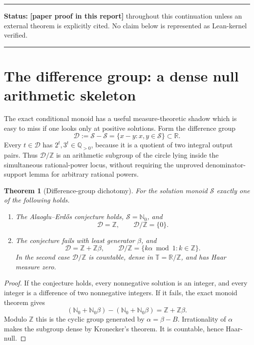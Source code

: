 \documentclass[11pt,oneside]{article}
\newtheorem{theorem}{Theorem}[section]
\theoremstyle{definition}
\theoremstyle{remark}
\newcommand{\Nzero}{\mathbb N_0}
\newcommand{\Z}{\mathbb Z}
\newcommand{\Q}{\mathbb Q}
\newcommand{\R}{\mathbb R}
\newcommand{\Torus}{\mathbb T}
\newcommand{\Sol}{\mathcal S}
\newcommand{\statusnew}{\textcolor{newgreen}{\textbf{[paper proof in this report]}}}
\newenvironment{statusbox}[1]
{\begin{center}\begin{minipage}{0.94\textwidth}\raggedright\hbadness=10000\hrule
\vspace{0.45em}\textbf{Status:} #1\par\vspace{0.35em}}
{\vspace{0.35em}\hrule\end{minipage}\end{center}}
\begin{document}
\begin{statusbox}{\statusnew{} throughout this continuation unless an external theorem is
explicitly cited.  No claim below is represented as Lean-kernel verified.}
\end{statusbox}

\section{The difference group: a dense null arithmetic skeleton}
\label{mt:sec-difference-group}

The exact conditional monoid has a useful measure-theoretic shadow which is easy to miss if one
looks only at positive solutions.  Form the difference group
\begin{equation}
  \mathcal D:=\Sol-\Sol
  =\{x-y:x,y\in\Sol\}\subset\R.
  \label{mt:eq-difference-group}
\end{equation}
Every $t\in\mathcal D$ has $2^t,3^t\in\Q_{>0}$, because it is a quotient of two integral
output pairs.  Thus $\mathcal D/\Z$ is an arithmetic subgroup of the circle lying inside the
simultaneous rational-power locus, without requiring the unproved denominator-support lemma
for arbitrary rational powers.

\begin{theorem}[Difference-group dichotomy]
\label{mt:thm-difference-group}
For the solution monoid $\Sol$ exactly one of the following holds.
\begin{enumerate}[label=\textup{(\roman*)}]
\item The Alaoglu--Erd\H{o}s conjecture holds, $\Sol=\Nzero$, and
\[
  \mathcal D=\Z,
  \qquad \mathcal D/\Z=\{0\}.
\]
\item The conjecture fails with least generator $\beta$, and
\[
  \mathcal D=\Z+\Z\beta,
  \qquad
  \mathcal D/\Z=\{k\alpha\bmod1:k\in\Z\}.
\]
In the second case $\mathcal D/\Z$ is countable, dense in $\Torus=\R/\Z$, and has Haar measure
zero.
\end{enumerate}
\end{theorem}

\begin{proof}
If the conjecture holds, every nonnegative solution is an integer, and every integer is a
difference of two nonnegative integers.  If it fails, the exact monoid theorem gives
\[
 (\Nzero+\Nzero\beta)-(\Nzero+\Nzero\beta)=\Z+\Z\beta.
\]
Modulo $\Z$ this is the cyclic group generated by $\alpha=\beta-B$.  Irrationality of $\alpha$
makes the subgroup dense by Kronecker's theorem.  It is countable, hence Haar-null.
\end{proof}
\end{document}
